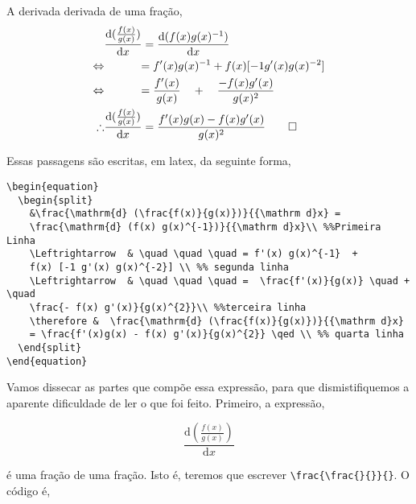 \documentclass[12pt,
brazilian,
a5paper]{abntex2} %
\begin{document}
  A derivada derivada de uma fração,
  \begin{equation}
    \begin{split}
      &\frac{\mathrm{d} (\frac{f(x)}{g(x)})}{{\mathrm d}x} =
      \frac{\mathrm{d} (f(x) g(x)^{-1})}{{\mathrm d}x}\\ %
      \Leftrightarrow  & \quad \quad \quad = f'(x) g(x)^{-1}  +
      f(x) [-1 g'(x) g(x)^{-2}] \\ %
      \Leftrightarrow  & \quad \quad \quad =  \frac{f'(x)}{g(x)} \quad + \quad
      \frac{- f(x) g'(x)}{g(x)^{2}}\\ %
      \therefore &  \frac{\mathrm{d} (\frac{f(x)}{g(x)})}{{\mathrm d}x}
      = \frac{f'(x)g(x) - f(x) g'(x)}{g(x)^{2}} \qed \\ %
    \end{split}
  \end{equation}

  Essas passagens são escritas, em latex, da seguinte forma,

\begin{verbatim}
\begin{equation}
  \begin{split}
    &\frac{\mathrm{d} (\frac{f(x)}{g(x)})}{{\mathrm d}x} =
    \frac{\mathrm{d} (f(x) g(x)^{-1})}{{\mathrm d}x}\\ %%Primeira Linha
    \Leftrightarrow  & \quad \quad \quad = f'(x) g(x)^{-1}  +
    f(x) [-1 g'(x) g(x)^{-2}] \\ %% segunda linha
    \Leftrightarrow  & \quad \quad \quad =  \frac{f'(x)}{g(x)} \quad + \quad
    \frac{- f(x) g'(x)}{g(x)^{2}}\\ %%terceira linha
    \therefore &  \frac{\mathrm{d} (\frac{f(x)}{g(x)})}{{\mathrm d}x}
    = \frac{f'(x)g(x) - f(x) g'(x)}{g(x)^{2}} \qed \\ %% quarta linha
  \end{split}
\end{equation}
\end{verbatim}

  Vamos dissecar as partes que compõe essa expressão, para que
  dismistifiquemos a aparente dificuldade de ler o que foi
  feito. Primeiro, a expressão,

  \begin{equation}
    \frac{\mathrm{d} (\frac{f(x)}{g(x)})}{{\mathrm d}x}
  \end{equation}

  é uma fração de uma fração. Isto é, teremos que escrever
  \verb+\frac{\frac{}{}}{}+. O código é,
\end{document}
